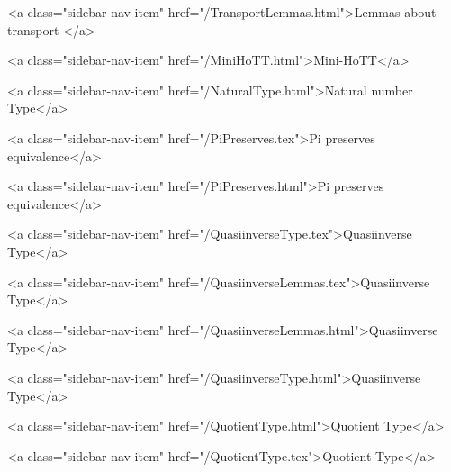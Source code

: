       
        
          <a class="sidebar-nav-item" href="/TransportLemmas.html">Lemmas about transport </a>
        
      
    
      
        
          <a class="sidebar-nav-item" href="/MiniHoTT.html">Mini-HoTT</a>
        
      
    
      
        
          <a class="sidebar-nav-item" href="/NaturalType.html">Natural number Type</a>
        
      
    
      
        
          <a class="sidebar-nav-item" href="/PiPreserves.tex">Pi preserves equivalence</a>
        
      
    
      
        
          <a class="sidebar-nav-item" href="/PiPreserves.html">Pi preserves equivalence</a>
        
      
    
      
        
          <a class="sidebar-nav-item" href="/QuasiinverseType.tex">Quasiinverse Type</a>
        
      
    
      
        
          <a class="sidebar-nav-item" href="/QuasiinverseLemmas.tex">Quasiinverse Type</a>
        
      
    
      
        
          <a class="sidebar-nav-item" href="/QuasiinverseLemmas.html">Quasiinverse Type</a>
        
      
    
      
        
          <a class="sidebar-nav-item" href="/QuasiinverseType.html">Quasiinverse Type</a>
        
      
    
      
        
          <a class="sidebar-nav-item" href="/QuotientType.html">Quotient Type</a>
        
      
    
      
        
          <a class="sidebar-nav-item" href="/QuotientType.tex">Quotient Type</a>
        
